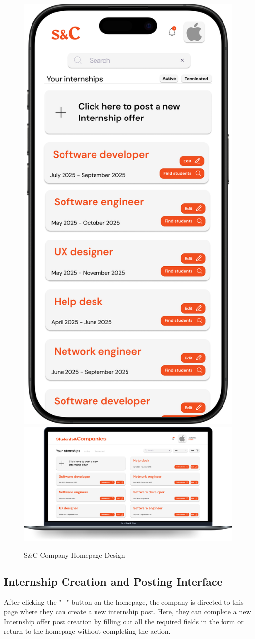 \begin{figure}[H]
    \centering
    \includegraphics[width=0.2\linewidth]{Images/Mock-up/mobile homepage company.png}
    \includegraphics[width=0.75\linewidth]{Images/Mock-up/homepage company.png}
    \caption{S\&C Company Homepage Design}
    \label{fig:homepage-design}
\end{figure}

\subsection{Internship Creation and Posting Interface}

After clicking the "+" button on the homepage, the company is directed to this page where they can create a new internship post. Here, they can complete a new Internship offer post creation by filling out all the required fields in the form or return to the homepage without completing the action. \\

